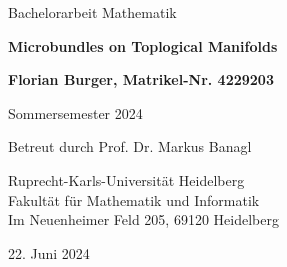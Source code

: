 \begin{titlepage}
\begin{center}
\vspace{1.5cm}

\begin{Large}Bachelorarbeit Mathematik\end{Large}

\vspace*{1cm}

\begin{LARGE}\textbf{Microbundles on Toplogical Manifolds}\end{LARGE}

\vspace*{1cm}

\begin{large}\textbf{Florian Burger, Matrikel-Nr. 4229203}\end{large}

\vspace{0.5cm}

\begin{large}Sommersemester 2024\end{large}

\vfill

\begin{large}
Betreut durch Prof. Dr. Markus Banagl

\vspace{0.5cm}

Ruprecht-Karls-Universität Heidelberg\\ Fakultät für Mathematik und Informatik\\ Im Neuenheimer Feld 205, 69120 Heidelberg

\vspace{0.5cm}
22. Juni 2024
\end{large}
\end{center}
\end{titlepage}